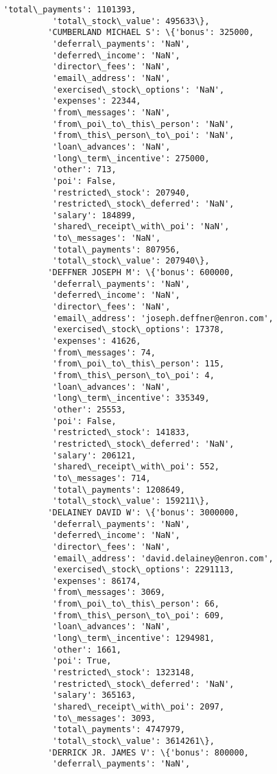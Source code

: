 \documentclass[11pt]{article}
\begin{document}
\begin{Verbatim}[commandchars=\\\{\}]
          'total\_payments': 1101393,
          'total\_stock\_value': 495633\},
         'CUMBERLAND MICHAEL S': \{'bonus': 325000,
          'deferral\_payments': 'NaN',
          'deferred\_income': 'NaN',
          'director\_fees': 'NaN',
          'email\_address': 'NaN',
          'exercised\_stock\_options': 'NaN',
          'expenses': 22344,
          'from\_messages': 'NaN',
          'from\_poi\_to\_this\_person': 'NaN',
          'from\_this\_person\_to\_poi': 'NaN',
          'loan\_advances': 'NaN',
          'long\_term\_incentive': 275000,
          'other': 713,
          'poi': False,
          'restricted\_stock': 207940,
          'restricted\_stock\_deferred': 'NaN',
          'salary': 184899,
          'shared\_receipt\_with\_poi': 'NaN',
          'to\_messages': 'NaN',
          'total\_payments': 807956,
          'total\_stock\_value': 207940\},
         'DEFFNER JOSEPH M': \{'bonus': 600000,
          'deferral\_payments': 'NaN',
          'deferred\_income': 'NaN',
          'director\_fees': 'NaN',
          'email\_address': 'joseph.deffner@enron.com',
          'exercised\_stock\_options': 17378,
          'expenses': 41626,
          'from\_messages': 74,
          'from\_poi\_to\_this\_person': 115,
          'from\_this\_person\_to\_poi': 4,
          'loan\_advances': 'NaN',
          'long\_term\_incentive': 335349,
          'other': 25553,
          'poi': False,
          'restricted\_stock': 141833,
          'restricted\_stock\_deferred': 'NaN',
          'salary': 206121,
          'shared\_receipt\_with\_poi': 552,
          'to\_messages': 714,
          'total\_payments': 1208649,
          'total\_stock\_value': 159211\},
         'DELAINEY DAVID W': \{'bonus': 3000000,
          'deferral\_payments': 'NaN',
          'deferred\_income': 'NaN',
          'director\_fees': 'NaN',
          'email\_address': 'david.delainey@enron.com',
          'exercised\_stock\_options': 2291113,
          'expenses': 86174,
          'from\_messages': 3069,
          'from\_poi\_to\_this\_person': 66,
          'from\_this\_person\_to\_poi': 609,
          'loan\_advances': 'NaN',
          'long\_term\_incentive': 1294981,
          'other': 1661,
          'poi': True,
          'restricted\_stock': 1323148,
          'restricted\_stock\_deferred': 'NaN',
          'salary': 365163,
          'shared\_receipt\_with\_poi': 2097,
          'to\_messages': 3093,
          'total\_payments': 4747979,
          'total\_stock\_value': 3614261\},
         'DERRICK JR. JAMES V': \{'bonus': 800000,
          'deferral\_payments': 'NaN',

\end{Verbatim}
\end{document}
